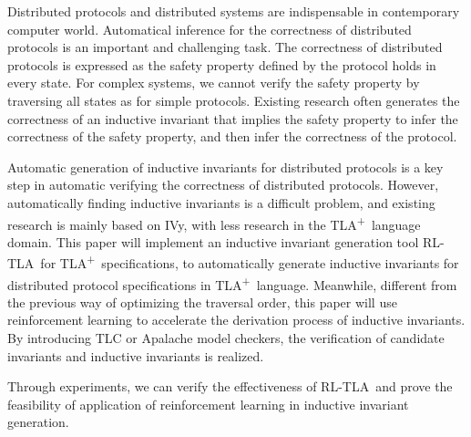 \documentclass[
    type = bachelor,
    degree = academic,
    twoside,
    fontset = win
]
{njuthesis}
\newcommand{\TLA}{TLA\textsuperscript{+}}
\newcommand{\rltla}{RL-TLA}
\begin{document}
\begin{abstract*}
    Distributed protocols and distributed systems are indispensable in contemporary computer world. Automatical inference for the correctness of distributed protocols is an important and challenging task.
    The correctness of distributed protocols is expressed as the safety property defined by the protocol holds in every state.
    For complex systems, we cannot verify the safety property by traversing all states as for simple protocols.
    Existing research often generates the correctness of an inductive invariant that implies the safety property to infer the correctness of the safety property, and then infer the correctness of the protocol.
    
    Automatic generation of inductive invariants for distributed protocols is a key step in automatic verifying the correctness of distributed protocols.
    However, automatically finding inductive invariants is a difficult problem, and existing research is mainly based on IVy, with less research in the \TLA \ language domain.
    This paper will implement an inductive invariant generation tool \rltla \ for \TLA \ specifications, to automatically generate inductive invariants for distributed protocol specifications in \TLA \ language.
    Meanwhile, different from the previous way of optimizing the traversal order, this paper will use reinforcement learning to accelerate the derivation process of inductive invariants.
    By introducing TLC or Apalache model checkers, the verification of candidate invariants and inductive invariants is realized.

    Through experiments, we can verify the effectiveness of \rltla \ and prove the feasibility of application of reinforcement learning in inductive invariant generation.

\end{abstract*}

\tableofcontents
\listoffigures
\listoftables

\mainmatter












\printbibliography
\end{document}
